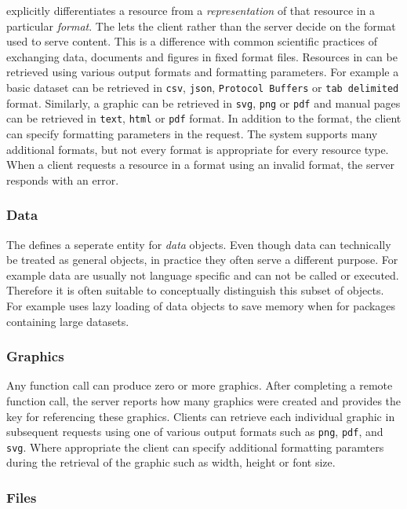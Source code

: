 \OpenCPU explicitly differentiates a resource from a \emph{representation} of that resource in a particular \emph{format}. The \API lets the client rather than the server decide on the format used to serve content. This is a difference with common scientific practices of exchanging data, documents and figures in fixed format files. Resources in \OpenCPU can be retrieved using various output formats and formatting parameters. For example a basic dataset can be retrieved in \texttt{csv}, \texttt{json}, \texttt{Protocol Buffers} or \texttt{tab delimited} format. Similarly, a graphic can be retrieved in \texttt{svg}, \texttt{png} or \texttt{pdf} and manual pages can be retrieved in \texttt{text}, \texttt{html} or \texttt{pdf} format. In addition to the format, the client can specify formatting parameters in the request. The system supports many additional formats, but not every format is appropriate for every resource type. When a client requests a resource in a format using an invalid format, the server responds with an error.   


\subsubsection{Data}

The \API defines a seperate entity for \emph{data} objects. Even though data can technically be treated as general objects, in practice they often serve a different purpose. For example data are usually not language specific and can not be called or executed. Therefore it is often suitable to conceptually distinguish this subset of objects. For example \R uses lazy loading of data objects to save memory when for packages containing large datasets.

\subsubsection{Graphics}

Any function call can produce zero or more graphics. After completing a remote function call, the server reports how many graphics were created and provides the key for referencing these graphics. Clients can retrieve each individual graphic in subsequent requests using one of various output formats such as \texttt{png}, \texttt{pdf}, and \texttt{svg}. Where appropriate the client can specify additional formatting paramters during the retrieval of the graphic such as width, height or font size.

\subsubsection{Files}

